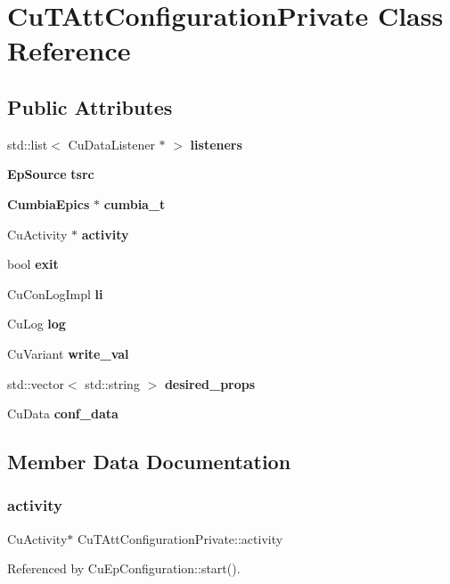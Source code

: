\section{Cu\+T\+Att\+Configuration\+Private Class Reference}
\label{classCuTAttConfigurationPrivate}
\subsection*{Public Attributes}
\begin{DoxyCompactItemize}
\item 
std\+::list$<$ Cu\+Data\+Listener $\ast$ $>$ \textbf{ listeners}
\item 
\textbf{ Ep\+Source} \textbf{ tsrc}
\item 
\textbf{ Cumbia\+Epics} $\ast$ \textbf{ cumbia\+\_\+t}
\item 
Cu\+Activity $\ast$ \textbf{ activity}
\item 
bool \textbf{ exit}
\item 
Cu\+Con\+Log\+Impl \textbf{ li}
\item 
Cu\+Log \textbf{ log}
\item 
Cu\+Variant \textbf{ write\+\_\+val}
\item 
std\+::vector$<$ std\+::string $>$ \textbf{ desired\+\_\+props}
\item 
Cu\+Data \textbf{ conf\+\_\+data}
\end{DoxyCompactItemize}


\subsection{Member Data Documentation}
\mbox{\label{classCuTAttConfigurationPrivate_a915f51b338fab8ccc3c6ce42ae7e2821}} 
\subsubsection{activity}
{\footnotesize\ttfamily Cu\+Activity$\ast$ Cu\+T\+Att\+Configuration\+Private\+::activity}



Referenced by Cu\+Ep\+Configuration\+::start().

\mbox{\label{classCuTAttConfigurationPrivate_a775e2e0204fa330101bbd568ba96328c}} 
